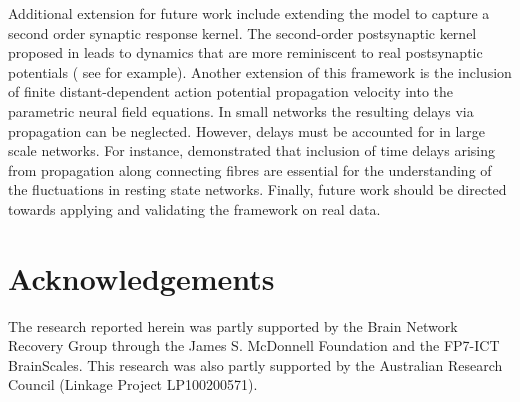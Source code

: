 \documentclass[review,authoryear,3p]{elsarticle}
\begin{document}
Additional extension for future work include extending the model to capture a second order synaptic response kernel. The second-order postsynaptic kernel proposed in \citet{VanRotterdam1982} leads to dynamics that are more reminiscent to real postsynaptic potentials ( see \citet{Spiegler2010,Spiegler2011} for example). Another extension of this framework is the inclusion of finite distant-dependent action potential propagation velocity into the parametric neural field equations. In small networks the resulting delays via propagation can be neglected. However, delays must be accounted for in large scale networks. For instance, \citet{Ghosh2008} demonstrated that inclusion of time delays arising from propagation along connecting fibres are essential for the understanding of the fluctuations in resting state networks. Finally, future work should be directed towards applying and validating the framework on real data.                                                                   

\section{Acknowledgements}
The research reported herein was partly supported by the Brain Network Recovery Group through the James S. McDonnell Foundation and the FP7-ICT BrainScales. This research was also partly supported by the Australian Research Council (Linkage Project LP100200571). 
\clearpage
\newpage
\end{document}
